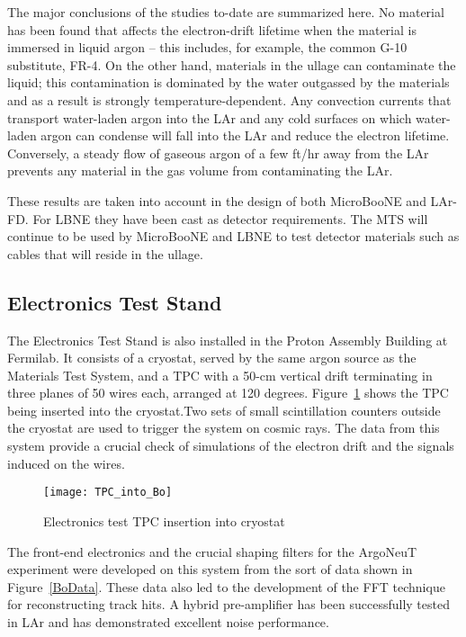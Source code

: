 The major conclusions of the studies to-date are summarized here. No material has been found that affects the electron-drift lifetime when the material is immersed in liquid argon -- this includes, for example, the common G-10 substitute, FR-4. On the other hand, materials in the ullage can contaminate the liquid; this contamination is dominated by the water outgassed by the materials and as a result is strongly temperature-dependent. Any convection currents that transport water-laden argon into the LAr and any cold surfaces on which water-laden argon can condense will fall into the LAr and reduce the electron lifetime. Conversely,  a steady flow of gaseous argon of a few ft/hr away from the LAr prevents any material in the gas volume from contaminating the LAr. 

These results are taken into account in the design of both MicroBooNE and LAr-FD. For LBNE they have been cast as detector requirements. The MTS will continue to be used by MicroBooNE and LBNE to test detector materials such as cables that will reside in the ullage.

\subsection{Electronics Test Stand}
The Electronics Test Stand is also installed in the Proton Assembly Building at Fermilab. It consists of a cryostat, served by the same argon source as the Materials Test System, and a TPC with a 50-cm vertical drift terminating in three planes of 50 wires each, arranged at 120 degrees. Figure~\ref{TPC} shows the TPC being inserted into the cryostat.Two sets of small scintillation counters outside the cryostat are used to trigger the system on cosmic rays. The data from this system provide a crucial check of simulations of the electron drift and the signals induced on the wires. 

\begin{figure}
\centering 
{\texttt{[image: TPC\_into\_Bo]}}
\caption{Electronics test TPC insertion into cryostat%
}
\label{TPC}
\end{figure}

The front-end electronics and the crucial shaping filters for the ArgoNeuT experiment were developed on this system from the sort of data shown in Figure~\ref{BoData}. These data also led to the development of the FFT technique for reconstructing track hits. A hybrid pre-amplifier has been successfully tested in LAr and has demonstrated excellent noise performance. 

